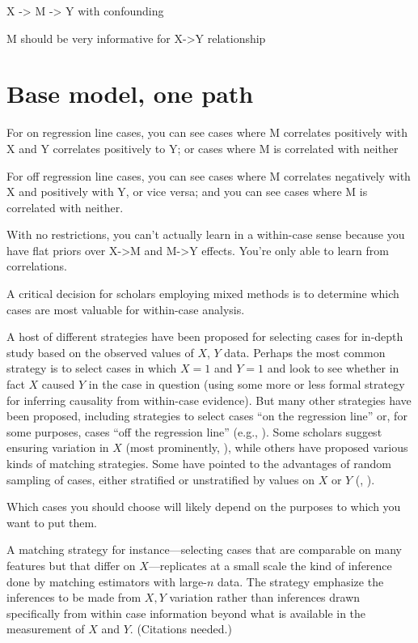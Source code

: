 \documentclass[12pt,]{book}
\begin{document}
X -\textgreater{} M -\textgreater{} Y with confounding

M should be very informative for X-\textgreater{}Y relationship

\hypertarget{base-model-one-path}{%
\section{Base model, one path}\label{base-model-one-path}}

For on regression line cases, you can see cases where M correlates positively with X and Y correlates positively to Y; or cases where M is correlated with neither

For off regression line cases, you can see cases where M correlates negatively with X and positively with Y, or vice versa; and you can see cases where M is correlated with neither.

With no restrictions, you can't actually learn in a within-case sense because you have flat priors over X-\textgreater{}M and M-\textgreater{}Y effects. You're only able to learn from correlations.

A critical decision for scholars employing mixed methods is to determine which cases are most valuable for within-case analysis.

A host of different strategies have been proposed for selecting cases for in-depth study based on the observed values of \(X\), \(Y\) data. Perhaps the most common strategy is to select cases in which \(X=1\) and \(Y=1\) and look to see whether in fact \(X\) caused \(Y\) in the case in question (using some more or less formal strategy for inferring causality from within-case evidence). But many other strategies have been proposed, including strategies to select cases ``on the regression line'' or, for some purposes, cases ``off the regression line'' (e.g., \citet{Lieberman2005nested}). Some scholars suggest ensuring variation in \(X\) (most prominently, \citet{king1994designing}), while others have proposed various kinds of matching strategies. Some have pointed to the advantages of random sampling of cases, either stratified or unstratified by values on \(X\) or \(Y\) (\citet{FL2008}, \citet{HerronQuinn}).

Which cases you should choose will likely depend on the purposes to which you want to put them.

A matching strategy for instance---selecting cases that are comparable on many features but that differ on \(X\)---replicates at a small scale the kind of inference done by matching estimators with large-\(n\) data. The strategy emphasize the inferences to be made from \(X,Y\) variation rather than inferences drawn specifically from within case information beyond what is available in the measurement of \(X\) and \(Y\). (Citations needed.)
\end{document}
